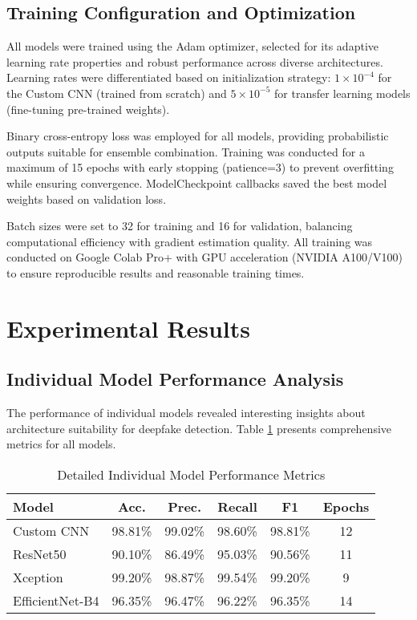 \documentclass[conference]{IEEEtran}
\begin{document}
\subsection{Training Configuration and Optimization}

All models were trained using the Adam optimizer, selected for its adaptive learning rate properties and robust performance across diverse architectures. Learning rates were differentiated based on initialization strategy: $1 \times 10^{-4}$ for the Custom CNN (trained from scratch) and $5 \times 10^{-5}$ for transfer learning models (fine-tuning pre-trained weights).

Binary cross-entropy loss was employed for all models, providing probabilistic outputs suitable for ensemble combination. Training was conducted for a maximum of 15 epochs with early stopping (patience=3) to prevent overfitting while ensuring convergence. ModelCheckpoint callbacks saved the best model weights based on validation loss.

Batch sizes were set to 32 for training and 16 for validation, balancing computational efficiency with gradient estimation quality. All training was conducted on Google Colab Pro+ with GPU acceleration (NVIDIA A100/V100) to ensure reproducible results and reasonable training times.

\section{Experimental Results}

\subsection{Individual Model Performance Analysis}

The performance of individual models revealed interesting insights about architecture suitability for deepfake detection. Table \ref{tab:detailed_individual_results} presents comprehensive metrics for all models.

\begin{table}[htbp]
\caption{Detailed Individual Model Performance Metrics}
\begin{center}
\begin{tabular}{lccccc}
\toprule
\textbf{Model} & \textbf{Acc.} & \textbf{Prec.} & \textbf{Recall} & \textbf{F1} & \textbf{Epochs} \\
\midrule
Custom CNN & 98.81\% & 99.02\% & 98.60\% & 98.81\% & 12 \\
ResNet50 & 90.10\% & 86.49\% & 95.03\% & 90.56\% & 11 \\
Xception & 99.20\% & 98.87\% & 99.54\% & 99.20\% & 9 \\
EfficientNet-B4 & 96.35\% & 96.47\% & 96.22\% & 96.35\% & 14 \\
\bottomrule
\end{tabular}
\label{tab:detailed_individual_results}
\end{center}
\end{table}
\end{document}
